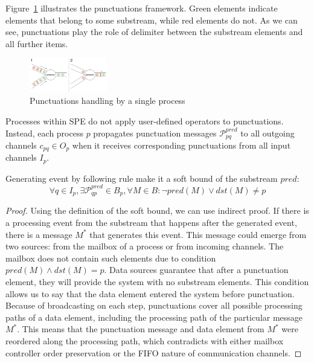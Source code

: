 Figure~\ref{punctuations_scheme} illustrates the punctuations framework. Green elements indicate elements that belong to some substream, while red elements do not. As we can see, punctuations play the role of delimiter between the substream elements and all further items.

\begin{figure}[htbp]
  \centering
  \includegraphics[width=0.30\textwidth]{pics/punctuations-scheme.pdf}
  \caption{Punctuations handling by a single process}
  \label{punctuations_scheme}
\end{figure}

Processes within SPE do not apply user-defined operators to punctuations. Instead, each process $p$ propagates punctuation messages $\mathcal{P}_{pq}^{pred}$ to all outgoing channels $c_{pq} \in O_p$  when it receives corresponding punctuations from all input channels $I_p$.

\begin{lemma}
Generating event by following rule make it a soft bound of the substream $pred$:
\begin{equation}
\forall q \in I_p, \exists \mathcal{P}^{pred}_{qp} \in B_p, \forall M\in B : \neg pred(M) \vee dst(M) \ne p
\end{equation}
\end{lemma}
\begin{proof}
Using the definition of the soft bound, we can use indirect proof. If there is a processing event from the substream that happens after the generated event, there is a message $M^*$ that generates this event. This message could emerge from two sources: from the mailbox of a process or from incoming channels. The mailbox does not contain such elements due to condition $pred(M) \wedge dst(M) = p$. Data sources guarantee that after a punctuation element, they will provide the system with no substream elements. This condition allows us to say that the data element entered the system before punctuation. Because of broadcasting on each step, punctuations cover all possible processing paths of a data element, including the processing path of the particular message $M^*$. This means that the punctuation message and data element from $M^*$ were reordered along the processing path, which contradicts with either mailbox controller order preservation or the FIFO nature of communication channels.
\end{proof}

